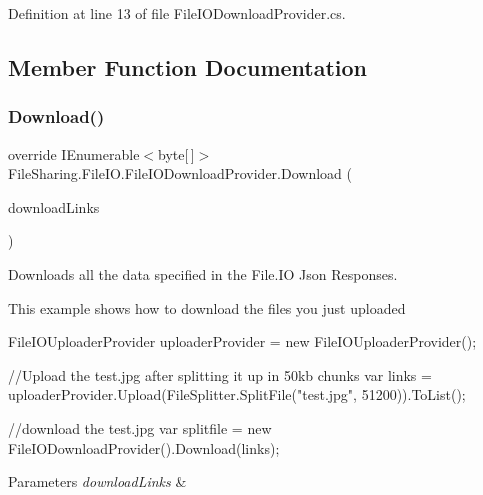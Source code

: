 Definition at line 13 of file File\+I\+O\+Download\+Provider.\+cs.



\subsection{Member Function Documentation}
\mbox{\label{class_file_sharing_1_1_file_i_o_1_1_file_i_o_download_provider_a0ff0bb3a458f9caa2daa5dc035b07c11}} 
\subsubsection{\texorpdfstring{Download()}{Download()}\hspace{0.1cm}{\footnotesize\ttfamily [1/2]}}
{\footnotesize\ttfamily override I\+Enumerable$<$byte\mbox{[}$\,$\mbox{]}$>$ File\+Sharing.\+File\+I\+O.\+File\+I\+O\+Download\+Provider.\+Download (\begin{DoxyParamCaption}\item[{I\+Enumerable$<$ string $>$}]{download\+Links }\end{DoxyParamCaption})\hspace{0.3cm}{\ttfamily [virtual]}}



Downloads all the data specified in the File.\+IO Json Responses. 

This example shows how to download the files you just uploaded 
\begin{DoxyCode}
FileIOUploaderProvider uploaderProvider = \textcolor{keyword}{new} FileIOUploaderProvider();

\textcolor{comment}{//Upload the test.jpg after splitting it up in 50kb chunks}
var links = uploaderProvider.Upload(FileSplitter.SplitFile(\textcolor{stringliteral}{"test.jpg"}, 51200)).ToList();

\textcolor{comment}{//download the test.jpg}
var splitfile = \textcolor{keyword}{new} FileIODownloadProvider().Download(links);
\end{DoxyCode}
 


\begin{DoxyParams}{Parameters}
{\em download\+Links} & \\
\hline
\end{DoxyParams}



